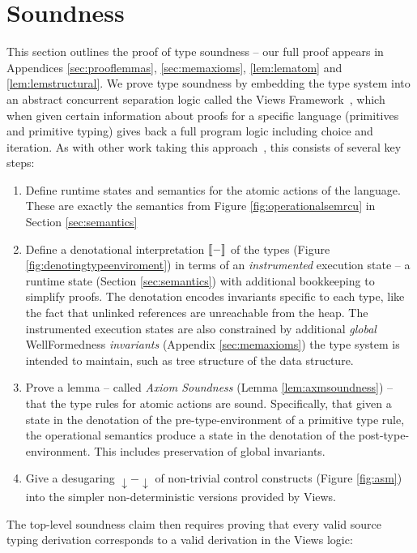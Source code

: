 \section{Soundness}
\label{sec:soundness}
This section outlines the proof of type soundness -- our full proof appears in Appendices \ref{sec:prooflemmas}, \ref{sec:memaxioms}, \ref{lem:lematom} and \ref{lem:lemstructural}.
We prove type soundness by embedding the type system into an abstract concurrent separation logic called the Views Framework~\cite{views}, which when given certain information about proofs for a specific language (primitives and primitive typing) gives back a full program logic including choice and iteration.  As with other work taking this approach~\cite{oopsla12,toplas17}, this consists of several key steps:
\begin{enumerate}
    \item Define runtime states and semantics for the atomic actions of the language.  These are exactly the semantics from Figure \ref{fig:operationalsemrcu} in Section \ref{sec:semantics}
    \item Define a denotational interpretation $\llbracket-\rrbracket$ of the types (Figure \ref{fig:denotingtypeenviroment}) in terms of an \emph{instrumented} execution state -- a runtime state (Section \ref{sec:semantics}) with additional bookkeeping to simplify proofs.  
    The denotation encodes invariants specific to each type, like the fact that \textsf{unlinked} references are unreachable from the heap. %
    The instrumented execution states are also constrained by additional \textit{global} \textsf{WellFormed}ness \textit{invariants} (Appendix \ref{sec:memaxioms}) the type system is intended to maintain, such as tree structure of the data structure.
    \item Prove a lemma -- called \emph{Axiom Soundness} (Lemma \ref{lem:axmsoundness}) -- that the type rules for atomic actions are sound.  Specifically, that given a state in the denotation of the pre-type-environment of a primitive type rule, the operational semantics produce a state in the denotation of the post-type-environment.  This includes preservation of global invariants.
    \item Give a desugaring $\downarrow-\downarrow$ of non-trivial control constructs (Figure \ref{fig:asm}) into the simpler non-deterministic versions provided by Views.
\end{enumerate}
The top-level soundness claim then requires proving that every valid source typing derivation corresponds to a valid derivation in the Views logic:

